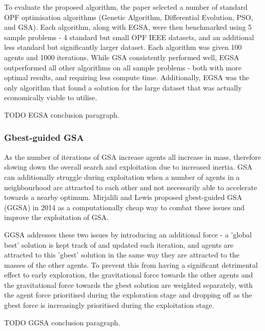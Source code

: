 To evaluate the proposed algorithm, the paper selected a number of standard OPF optimisation algorithms (Genetic Algorithm, Differential Evolution, PSO, and GSA).
Each algorithm, along with EGSA, were then benchmarked using 5 sample problems - 4 standard but small OPF IEEE datasets, and an additional less standard but significantly larger dataset.
Each algorithm was given 100 agents and 1000 iterations.
While GSA consistently performed well, EGSA outperformed all other algorithms on all sample problems - both with more optimal results, and requiring less compute time.
Additionally, EGSA was the only algorithm that found a solution for the large dataset that was actually economically viable to utilise.

TODO EGSA conclusion paragraph.


\subsubsection{Gbest-guided GSA}\label{sec:alg:gsa:ggsa}
As the number of iterations of GSA increase agents all increase in mass, therefore slowing down the overall search and exploitation due to increased inertia.
GSA can additionally struggle during exploitation when a number of agents in a neighbourhood are attracted to each other and not necessarily able to accelerate towards a nearby optimum.
Mirjalili and Lewis \cite{GGSA} proposed gbest-guided GSA (GGSA) in 2014 as a computationally cheap way to combat these issues and improve the exploitation of GSA.


GGSA addresses these two issues by introducing an additional force - a 'global best' solution is kept track of and updated each iteration, and agents are attracted to this 'gbest' solution in the same way they are attracted to the masses of the other agents.
To prevent this from having a significant detrimental effect to early exploration, the gravitational force towards the other agents and the gravitational force towards the gbest solution are weighted separately, with the agent force prioritised during the exploration stage and dropping off as the gbest force is increasingly prioritised during the exploitation stage.


TODO GGSA conclusion paragraph.
